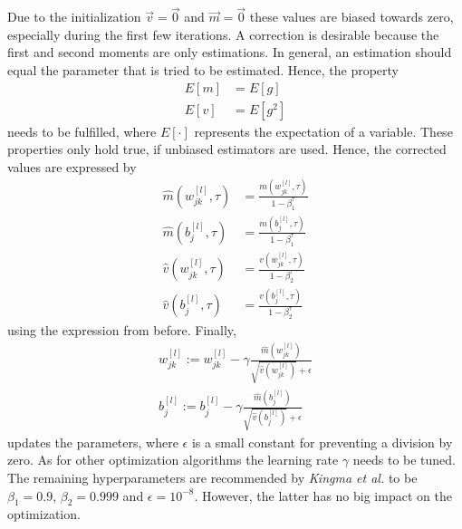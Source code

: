 Due to the initialization $\vec{v} = \vec{0}$ and $\vec{m} = \vec{0}$ these values are biased towards zero, especially during the first few iterations.
A correction is desirable because the first and second moments are only estimations.
In general, an estimation should equal the parameter that is tried to be estimated.
Hence, the property
\begin{subequations}
	\begin{align}
		E[m] &= E[g]\\
		E[v] &= E[g^2]
	\end{align}
\end{subequations}
needs to be fulfilled, where $E[\cdot]$ represents the expectation of a variable.
These properties only hold true, if unbiased estimators are used.
Hence, the corrected values are expressed by
\begin{subequations}
	\label{eq:adam-corrected}
	\begin{align}
	\hat{m}(w^{[l]}_{jk}, \tau) &= \frac{m(w^{[l]}_{jk},\tau)}{1-\beta_1^\tau} \\
	\hat{m}(b^{[l]}_{j}, \tau) &= \frac{m(b^{[l]}_{j},\tau)}{1-\beta_1^\tau} \\
	\hat{v}(w^{[l]}_{jk}, \tau) &= \frac{v(w^{[l]}_{jk}, \tau)}{1-\beta_2^\tau} \\
	\hat{v}(b^{[l]}_{j}, \tau) &= \frac{v(b^{[l]}_{j}, \tau)}{1-\beta_2^\tau}
	\end{align}
\end{subequations}
using the expression from before.
Finally,
\begin{subequations}
	\label{eq:adam-update}
	\begin{align}
		w^{[l]}_{jk} := w^{[l]}_{jk}-\gamma \frac{\hat{m}(w^{[l]}_{jk})}{\sqrt{\hat{v}(w^{[l]}_{jk})} + \epsilon} \\
		b^{[l]}_{j} := b^{[l]}_{j}-\gamma \frac{\hat{m}(b^{[l]}_{j})}{\sqrt{\hat{v}(b^{[l]}_{j})} + \epsilon}
	\end{align}
\end{subequations}
updates the parameters, where $\epsilon$ is a small constant for preventing a division by zero.
As for other optimization algorithms the learning rate $\gamma$ needs to be tuned.
The remaining hyperparameters are recommended by \textit{Kingma et al.} to be $\beta_1 = 0.9$, $\beta_2 = 0.999$ and $\epsilon = 10^{-8}$.
However, the latter has no big impact on the optimization.